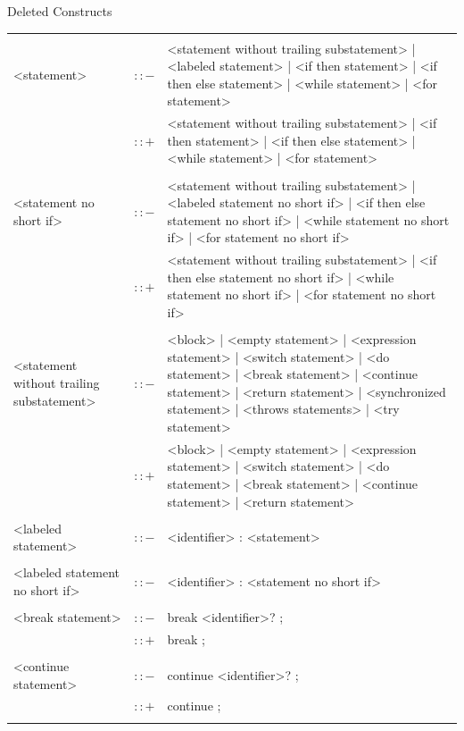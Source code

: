 \documentclass[landscape, 11pt]{article}
\begin{document}
\begin{qsection}{Deleted Constructs}
\begin{enumerate}[label=\bt{\theenumi.}]
			\begin{longtable}{R{7cm} c L{15cm}}
													&					&	 \\
				<statement>									&	$\colon\colon-$	&	<statement without trailing substatement> | <labeled statement> | <if then statement> | <if then else statement> | <while statement> | <for statement> \\
															&	$\colon\colon+$	&	<statement without trailing substatement> | <if then statement> | <if then else statement> | <while statement> | <for statement> \\\\
				<statement no short if>						&	$\colon\colon-$	&	<statement without trailing substatement> | <labeled statement no short if> | <if then else statement no short if> | <while statement no short if> | <for statement no short if> \\
															&	$\colon\colon+$	&	<statement without trailing substatement> | <if then else statement no short if> | <while statement no short if> | <for statement no short if> \\\\
				<statement without trailing substatement>	&	$\colon\colon-$	&	<block> | <empty statement> | <expression statement> | <switch statement> | <do statement> | <break statement> | <continue statement> | <return statement> | <synchronized statement> | <throws statements> | <try statement> \\
															&	$\colon\colon+$	&	<block> | <empty statement> | <expression statement> | <switch statement> | <do statement> | <break statement> | <continue statement> | <return statement> \\\\
				<labeled statement>							&	$\colon\colon-$	&	<identifier> : <statement> \\\\
				<labeled statement no short if>				&	$\colon\colon-$	&	<identifier> : <statement no short if> \\\\
				<break statement>							&	$\colon\colon-$	&	break <identifier>? ; \\
															&	$\colon\colon+$	&	break ; \\\\
				<continue statement>						&	$\colon\colon-$	&	continue <identifier>? ; \\
															&	$\colon\colon+$	&	continue ; \\\\

\end{longtable}
\end{enumerate}
\end{qsection}
\end{document}

